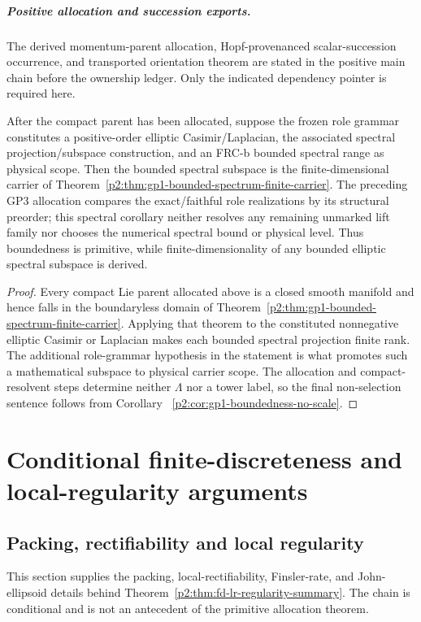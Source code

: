 \documentclass[11pt,a4paper]{article}
\begin{document}
\subparagraph{Positive allocation and succession exports.}
The derived momentum-parent allocation, Hopf-provenanced scalar-succession
occurrence, and transported orientation theorem are stated in the positive
main chain before the ownership ledger.  Only the indicated dependency pointer is required here.

\begin{corollary}
\label{p2:cor:dependency-complete-spectral-realization}
After the compact parent has been allocated, suppose the frozen role grammar
constitutes a positive-order elliptic Casimir/Laplacian, the associated spectral
projection/subspace construction, and an FRC-b bounded spectral range as
physical scope.  Then the bounded spectral subspace is the finite-dimensional
carrier of
Theorem~\ref{p2:thm:gp1-bounded-spectrum-finite-carrier}.  The preceding GP3 allocation compares the exact/faithful role realizations by
its structural preorder; this spectral corollary neither resolves any remaining
unmarked lift family nor chooses the numerical spectral bound or physical level.  Thus
boundedness is primitive, while finite-dimensionality of any bounded elliptic
spectral subspace is derived.
\end{corollary}

\begin{proof}
Every compact Lie parent allocated above is a closed smooth manifold and hence
falls in the boundaryless domain of
Theorem~\ref{p2:thm:gp1-bounded-spectrum-finite-carrier}.  Applying that theorem to the constituted nonnegative elliptic Casimir or
Laplacian makes each bounded spectral projection finite rank.  The additional
role-grammar hypothesis in the statement is what promotes such a mathematical
subspace to physical carrier scope.  The allocation and compact-resolvent
steps determine neither \(\Lambda\) nor a tower label, so the final
non-selection sentence follows from Corollary~
\ref{p2:cor:gp1-boundedness-no-scale}.
\end{proof}




\section{Conditional finite-discreteness and local-regularity arguments}
\label{p2f:sec:fd-lr-technical}
\subsection{Packing, rectifiability and local regularity}
\label{p2:app:fd-lr-technical-chain}
This section supplies the packing, local-rectifiability, Finsler-rate, and
John-ellipsoid details behind
Theorem~\ref{p2:thm:fd-lr-regularity-summary}.  The chain is conditional and
is not an antecedent of the primitive allocation theorem.
\end{document}
